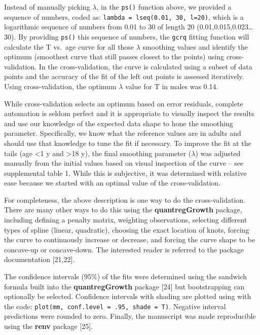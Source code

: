 \documentclass[]{elsarticle} %
\begin{document}
Instead of manually picking \(\lambda\), in the \texttt{ps()} function
above, we provided a sequence of numbers, coded as:
\texttt{lambda\ =\ lseq(0.01,\ 30,\ l=20)}, which is a logarithmic
sequence of numbers from 0.01 to 30 of length 20
(0.01,0.015,0.023\ldots30). By providing \texttt{ps()} this sequence of
numbers, the \texttt{gcrq} fitting function will calculate the T vs.~age
curve for all those \(\lambda\) smoothing values and identify the
optimum (smoothest curve that still passes closest to the points) using
cross-validation. In the cross-validation, the curve is calculated using
a subset of data points and the accuracy of the fit of the left out
points is assessed iteratively. Using cross-validation, the optimum
\(\lambda\) value for T in males was 0.14.

While cross-validation selects an optimum based on error residuals,
complete automation is seldom perfect and it is appropriate to visually
inspect the results and use our knowledge of the expected data shape to
hone the smoothing parameter. Specifically, we know what the reference
values are in adults and should use that knowledge to tune the fit if
necessary. To improve the fit at the tails (age \textless1 y and
\textgreater18 y), the final smoothing parameter (\(\lambda\)) was
adjusted manually from the initial values based on visual inspection of
the curve -- see supplemental table 1. While this is subjective, it was
determined with relative ease because we started with an optimal value
of the cross-validation.

For completeness, the above description is one way to do the
cross-validation. There are many other ways to do this using the
\textbf{quantregGrowth} package, including defining a penalty matrix,
weighting observations, selecting different types of spline (linear,
quadratic), choosing the exact location of knots, forcing the curve to
continuously increase or decrease, and forcing the curve shape to be
concave-up or concave-down. The interested reader is referred to the
package documentation {[}21,22{]}.

The confidence intervals (95\%) of the fits were determined using the
sandwich formula built into the \textbf{quantregGrowth} package {[}24{]}
but bootstrapping can optionally be selected. Confidence intervals with
shading are plotted using with the code:
\texttt{plot(mm,\ conf.level\ =\ .95,\ shade\ =\ T)}. Negative interval
predictions were rounded to zero. Finally, the manuscript was made
reproducible using the \textbf{renv} package {[}25{]}.
\end{document}
